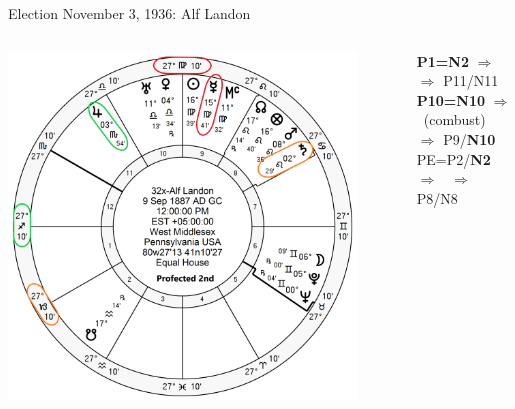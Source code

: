 \begin{frame}[t]{Election November 3, 1936: Alf Landon}
\begin{columns}[T, onlytextwidth]
\vspace{-1em}
{\includegraphics[width=0.9\textwidth]{charts/Landon-Prof-2nd.png}}

\textbf{\dgreen P1=N2} 
	$\Rightarrow$ \Jupiter\, $\Rightarrow$ P11/N11\\
\textbf{\red P10=N10}
	$\Rightarrow$ \Mercury\, (combust) $\Rightarrow$ P9/\textbf{\red N10}\\
PE=P2/\textbf{\dgreen N2}
	$\Rightarrow$ \Saturn\, $\Rightarrow$ P8/N8

\end{columns}
\end{frame}
